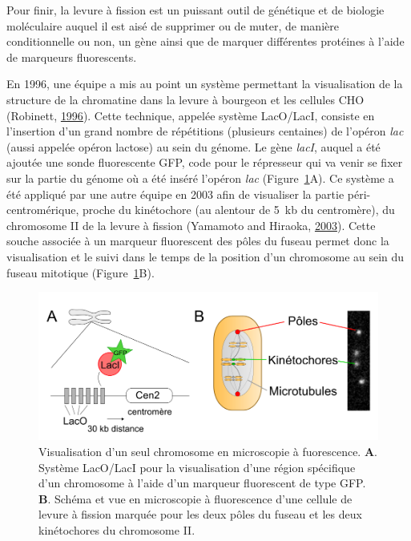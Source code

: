 \documentclass[12pt,a4paper,twoside,openright]{book}
\begin{document}
Pour finir, la levure à fission est un puissant outil de génétique et de
biologie moléculaire auquel il est aisé de supprimer ou de muter, de
manière conditionnelle ou non, un gène ainsi que de marquer différentes
protéines à l'aide de marqueurs fluorescents.

En 1996, une équipe a mis au point un système permettant la
visualisation de la structure de la chromatine dans la levure à bourgeon
et les cellules CHO (Robinett,
\protect\hyperlink{ref-Robinett1996}{1996}). Cette technique, appelée
système LacO/LacI, consiste en l'insertion d'un grand nombre de
répétitions (plusieurs centaines) de l'opéron \emph{lac} (aussi appelée
opéron lactose) au sein du génome. Le gène \emph{lacI}, auquel a été
ajoutée une sonde fluorescente GFP, code pour le répresseur qui va venir
se fixer sur la partie du génome où a été inséré l'opéron \emph{lac}
(Figure~\ref{fig:lac}A). Ce système a été appliqué par une autre équipe
en 2003 afin de visualiser la partie péri-centromérique, proche du
kinétochore (au alentour de 5~kb du centromère), du chromosome II de la
levure à fission (Yamamoto and Hiraoka,
\protect\hyperlink{ref-Yamamoto2003}{2003}). Cette souche associée à un
marqueur fluorescent des pôles du fuseau permet donc la visualisation et
le suivi dans le temps de la position d'un chromosome au sein du fuseau
mitotique (Figure~\ref{fig:lac}B).

\begin{figure}[htbp]
\centering
\includegraphics{figures/intro/lac.png}
\caption[Visualisation d'un seul chromosome en microscopie à fuorescence]{\label{fig:lac}Visualisation
d'un seul chromosome en microscopie à fuorescence. \textbf{A}. Système
LacO/LacI pour la visualisation d'une région spécifique d'un chromosome
à l'aide d'un marqueur fluorescent de type GFP. \textbf{B}. Schéma et
vue en microscopie à fluorescence d'une cellule de levure à fission
marquée pour les deux pôles du fuseau et les deux kinétochores du
chromosome II.}
\end{figure}
\end{document}
